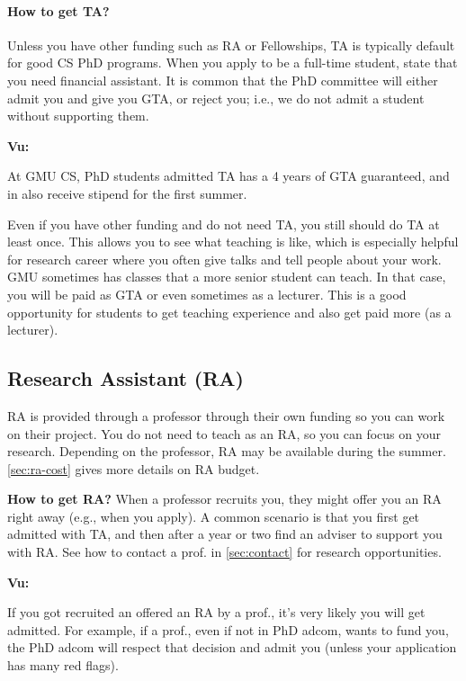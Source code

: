 \documentclass[oneside,11pt]{memoir}
\newenvironment{commentbox}[1][]{
  \small
  \begin{mybox}
    {\small \textbf{#1}}
  }{
  \end{mybox}
}
\begin{document}
\paragraph{How to get TA?}  Unless you have other funding such as RA or Fellowships, TA is typically default for good CS PhD programs. When you apply to be a full-time student,  state that you need financial assistant. It is common that the PhD committee will either admit you and give you GTA, or reject you; i.e., we do not admit a student without supporting them.  

\begin{commentbox}[Vu:]
  At GMU CS, PhD students admitted TA has a 4 years of GTA guaranteed, and in also receive  stipend for the first summer.
\end{commentbox}

Even if you have other funding and do not need TA, you still should do TA at least once.  This allows you to see what teaching is like, which is especially helpful for research career where you often give talks and tell people about your work. GMU sometimes has classes that a more senior student can teach.  In that case, you will be paid as GTA or even sometimes as a lecturer.  This is a good opportunity for students to get teaching experience and also get paid more (as a lecturer).

\subsection{Research Assistant (RA)}
RA is provided through a professor through their own funding so you can work on their project.  
You do not need to teach as an RA, so you can focus on your research. Depending on the professor, RA may be available during the summer. \autoref{sec:ra-cost} gives more details on RA budget.

\textbf{How to get RA?} When a professor recruits you, they might offer you an RA right away (e.g., when you apply).  A common scenario is that you first get admitted with TA, and then after a year or two find an adviser to support you with RA. See how to contact a prof. in \autoref{sec:contact} for research opportunities.


\begin{commentbox}[Vu:]
  If you got recruited an offered an RA by a prof., it's very likely you will get admitted.  For example, if a prof., even if not in PhD adcom, wants to fund you, the PhD adcom will respect that decision and admit you (unless your application has many red flags).
\end{commentbox}
\end{document}

